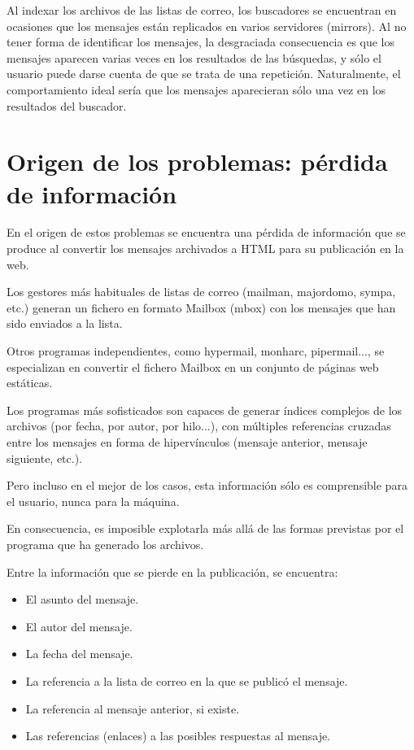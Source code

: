 Al indexar los archivos de las listas de correo, los buscadores se encuentran
en ocasiones que los mensajes están replicados en varios servidores (mirrors).
Al no tener forma de identificar los mensajes, la desgraciada consecuencia
es que los mensajes aparecen varias veces en los resultados de las búsquedas,
y sólo el usuario puede darse cuenta de que se trata de una repetición.
Naturalmente, el comportamiento ideal sería que los mensajes aparecieran
sólo una vez en los resultados del buscador.

\section*{Origen de los problemas: pérdida de información}

En el origen de estos problemas se encuentra una pérdida de información
que se produce al convertir los mensajes archivados a HTML para su publicación
en la web.

Los gestores más habituales de listas de correo (mailman, majordomo, sympa,
etc.) generan un fichero en formato Mailbox (mbox) con los mensajes que
han sido enviados a la lista.

Otros programas independientes, como hypermail, monharc, pipermail..., se
especializan en convertir el fichero Mailbox en un conjunto de páginas
web estáticas.

Los programas más sofisticados son capaces de generar índices complejos
de los archivos (por fecha, por autor, por hilo...), con múltiples referencias
cruzadas entre los mensajes en forma de hipervínculos (mensaje anterior,
mensaje siguiente, etc.).

Pero incluso en el mejor de los casos, esta información sólo es comprensible
para el usuario, nunca para la máquina.

En consecuencia, es imposible explotarla más allá de las formas previstas
por el programa que ha generado los archivos.

Entre la información que se pierde en la publicación, se encuentra:

\begin{itemize}
 \item El asunto del mensaje.
 \item El autor del mensaje.
 \item La fecha del mensaje.
 \item La referencia a la lista de correo en la que se publicó el mensaje.
 \item La referencia al mensaje anterior, si existe.
 \item Las referencias (enlaces) a las posibles respuestas al mensaje.
\end{itemize}

